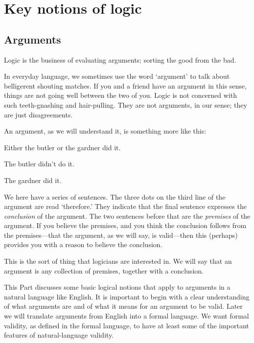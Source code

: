 \part{Key notions of logic}
\label{ch.intro}


\chapter{Arguments}
\label{s:Arguments}

Logic is the business of evaluating arguments; sorting the good from the bad. 

In everyday language, we sometimes use the word `argument' to talk about belligerent shouting matches.  If you and a friend have an argument in this sense, things are not going well between the two of you. Logic is not concerned with such teeth-gnashing and hair-pulling. They are not arguments, in our sense; they are just disagreements.

An argument, as we will understand it, is something more like this:
	\begin{earg}\label{argButlerGardner}
		\item[] Either the butler or the gardner did it.
		\item[] The butler didn't do it.
		\item[\therefore] The gardner did it.
	\end{earg}
We here have a series of sentences. The three dots on the third line of the argument are read `therefore.' They indicate that the final sentence expresses the \emph{conclusion} of the argument. The two sentences before that are the \emph{premises} of the argument. If you believe the premises, and you think the conclusion follows from the premises---that the argument, as we will say, is valid---then this (perhaps) provides you with a reason to believe the conclusion. 

This is the sort of thing that logicians are interested in. We will say that an argument is any collection of premises, together with a conclusion. 

This Part discusses some basic logical notions that apply to arguments in a natural language like English. It is important to begin with a clear understanding of what arguments are and of what it means for an argument to be valid. Later we will translate arguments from English into a formal language. We want formal validity, as defined in the formal language, to have at least some of the important features of natural-language validity.

